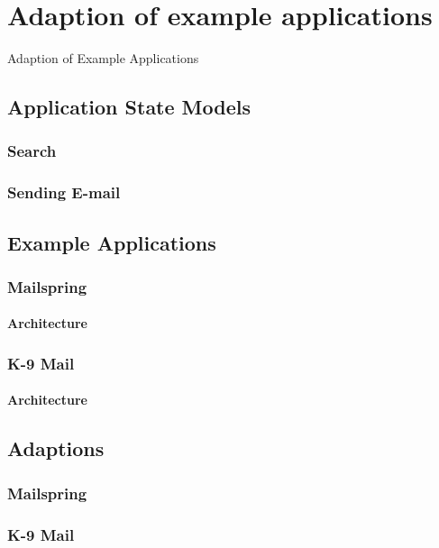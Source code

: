 \chapter{Adaption of example applications}
\label{ch:adaption}


Adaption of Example Applications

\section{Application State Models}
\subsection{Search}
\subsection{Sending E-mail}

\section{Example Applications}
\subsection{Mailspring}
\subsubsection{Architecture}
\subsection{K-9 Mail}
\subsubsection{Architecture}

\section{Adaptions}
\subsection{Mailspring}
\subsection{K-9 Mail}
